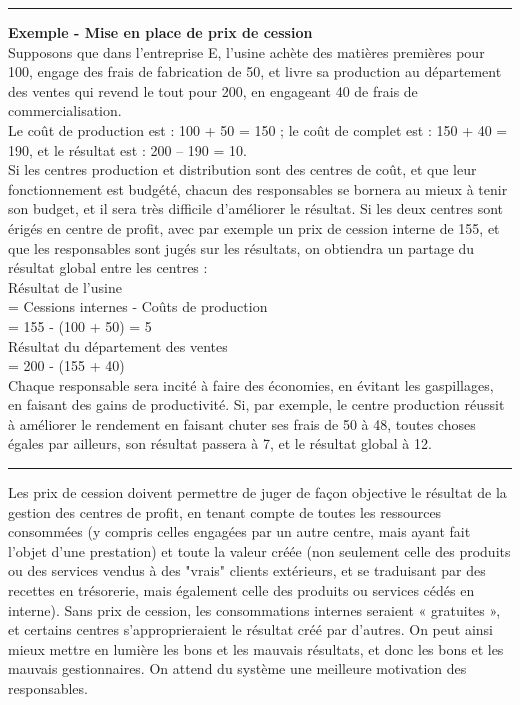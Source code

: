 \documentclass{tufte-handout}
\begin{document}
\noindent\rule{\textwidth}{0.5pt}
\textbf{Exemple - Mise en place de prix de cession}\\
Supposons que dans l’entreprise E, l'usine achète des matières premières pour 100, engage des frais de fabrication de 50, et livre sa production au département des ventes qui revend le tout pour 200, en engageant 40 de frais de commercialisation.\\
Le coût de production est : 100 + 50 = 150 ; le coût de complet est : 150 + 40 = 190, et le résultat est : 200 – 190 = 10.\\
Si les centres production et distribution sont des centres de coût, et que leur fonctionnement est budgété, chacun des responsables se bornera au mieux à tenir son budget, et il sera très difficile d’améliorer le résultat. Si les deux centres sont érigés en centre de profit, avec par exemple un prix de cession interne de 155, et que les responsables sont jugés sur les résultats, on obtiendra un partage du résultat global entre les centres :\\
Résultat de l'usine\\
= Cessions internes - Coûts de production\\
= 155 - (100 + 50) = 5\\
Résultat du département des ventes\\
= 200 - (155 + 40)\\
Chaque responsable sera incité à faire des économies, en évitant les gaspillages, en faisant des gains de productivité. Si, par exemple, le centre production réussit à améliorer le rendement en faisant chuter ses frais de 50 à 48, toutes choses égales par ailleurs, son résultat passera à 7, et le résultat global à 12.\\

\noindent\rule{\textwidth}{0.5pt}

Les prix de cession doivent permettre de juger de façon objective le résultat de la gestion des centres de profit, en tenant compte de toutes les ressources consommées (y compris celles engagées par un autre centre, mais ayant fait l’objet d’une prestation) et toute la valeur créée (non seulement celle des produits ou des services vendus à des "vrais" clients extérieurs, et se traduisant par des recettes en trésorerie, mais également celle des produits ou services cédés en interne). Sans prix de cession, les consommations internes seraient « gratuites », et certains centres s’approprieraient le résultat créé par d’autres. On peut ainsi mieux mettre en lumière les bons et les mauvais résultats, et donc les bons et les mauvais gestionnaires. On attend du système une meilleure motivation des responsables.\\
\end{document}
